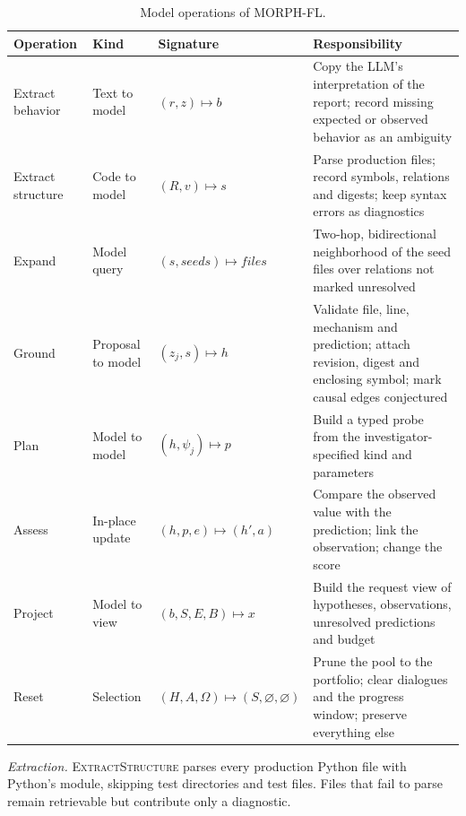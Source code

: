 \documentclass[a4paper,fleqn]{cas-sc}
\newcommand{\tool}{MORPH-FL}
\newcommand{\code}[1]{\texttt{\detokenize{#1}}}
\begin{document}
\begin{table}[width=\FullWidth,pos=!htbp]
\caption{Model operations of \tool{}.}\label{tab:operations}
\centering\small\setlength{\tabcolsep}{3pt}
\renewcommand{\arraystretch}{1.12}
\begin{tabular}{@{}>{\raggedright\arraybackslash}p{}>{\raggedright\arraybackslash}p{}>{\raggedright\arraybackslash}p{}>{\raggedright\arraybackslash}p{}@{}}\toprule
Operation & Kind & Signature & Responsibility\\\midrule
Extract behavior & Text to model & $(r,z)\mapsto b$ & Copy the LLM's interpretation of the report; record missing expected or observed behavior as an ambiguity\\
Extract structure & Code to model & $(R,v)\mapsto s$ & Parse production files; record symbols, relations and digests; keep syntax errors as diagnostics\\
Expand & Model query & $(s,\textit{seeds})\mapsto\textit{files}$ & Two-hop, bidirectional neighborhood of the seed files over relations not marked unresolved\\
Ground & Proposal to model & $(z_j,s)\mapsto h$ & Validate file, line, mechanism and prediction; attach revision, digest and enclosing symbol; mark causal edges conjectured\\
Plan & Model to model & $(h,\psi_j)\mapsto p$ & Build a typed probe from the investigator-specified kind and parameters\\
Assess & In-place update & $(h,p,e)\mapsto(h',a)$ & Compare the observed value with the prediction; link the observation; change the score\\
Project & Model to view & $(b,S,E,B)\mapsto x$ & Build the request view of hypotheses, observations, unresolved predictions and budget\\
Reset & Selection & $(H,A,\Omega)\mapsto(S,\varnothing,\varnothing)$ & Prune the pool to the portfolio; clear dialogues and the progress window; preserve everything else\\
\bottomrule\end{tabular}
\end{table}

\emph{Extraction.} \textsc{ExtractStructure} parses every production Python file with Python's \code{ast} module, skipping test directories and test files. Files that fail to parse remain retrievable but contribute only a diagnostic.
\end{document}
